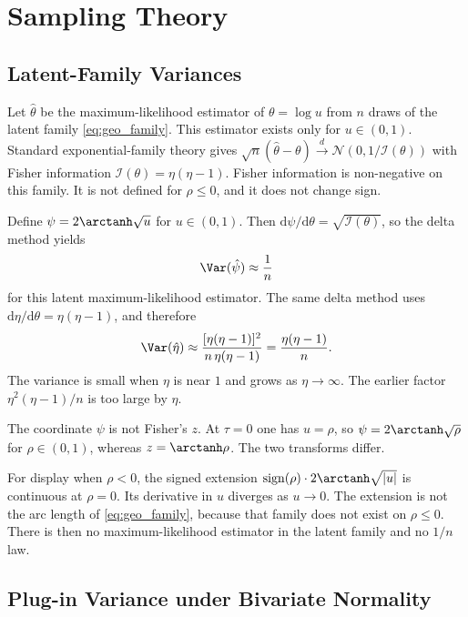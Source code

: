 \section{Sampling Theory}
\label{sec:sampling}

\subsection{Latent-Family Variances}

Let $\hat\theta$ be the maximum-likelihood estimator of $\theta = \log u$ from $n$ draws of the latent family \cref{eq:geo_family}.
This estimator exists only for $u\in(0,1)$.
Standard exponential-family theory gives $\sqrt{n}(\hat\theta-\theta)\xrightarrow{d}\mathcal{N}(0,1/\mathcal{I}(\theta))$ with Fisher information $\mathcal{I}(\theta) = \eta(\eta-1)$.
Fisher information is non-negative on this family.
It is not defined for $\rho\le 0$, and it does not change sign.

Define $\psi = 2\arctanh\sqrt{u}$ for $u\in(0,1)$.
Then $\mathrm{d}\psi/\mathrm{d}\theta = \sqrt{\mathcal{I}(\theta)}$, so the delta method yields
\begin{equation}
  \Var(\hat\psi) \approx \frac{1}{n}
  \label{eq:psi_clt}
\end{equation}
for this latent maximum-likelihood estimator.
The same delta method uses $\mathrm{d}\eta/\mathrm{d}\theta = \eta(\eta-1)$, and therefore
\begin{equation}
  \Var(\hat\eta)
  \approx \frac{[\eta(\eta-1)]^{2}}{n\,\eta(\eta-1)}
  = \frac{\eta(\eta-1)}{n}.
  \label{eq:var_eta_latent}
\end{equation}
The variance is small when $\eta$ is near $1$ and grows as $\eta\to\infty$.
The earlier factor $\eta^{2}(\eta-1)/n$ is too large by $\eta$.

The coordinate $\psi$ is not Fisher's $z$.
At $\tau = 0$ one has $u = \rho$, so $\psi = 2\arctanh\sqrt{\rho}$ for $\rho\in(0,1)$, whereas $z = \arctanh\rho$.
The two transforms differ.

For display when $\rho<0$, the signed extension $\operatorname{sign}(\rho)\cdot 2\arctanh\sqrt{|u|}$ is continuous at $\rho = 0$.
Its derivative in $u$ diverges as $u\to 0$.
The extension is not the arc length of \cref{eq:geo_family}, because that family does not exist on $\rho\le 0$.
There is then no maximum-likelihood estimator in the latent family and no $1/n$ law.

\subsection{Plug-in Variance under Bivariate Normality}

